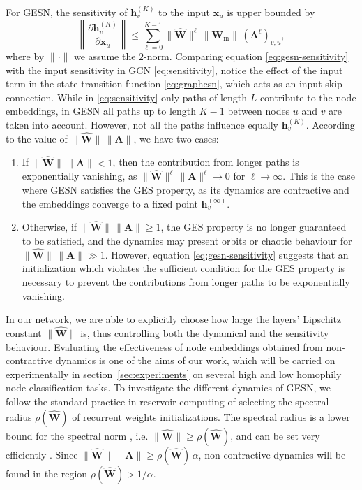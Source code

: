 \documentclass[final,5p,times,twocolumn]{elsarticle}
\begin{document}
For GESN, the sensitivity of $\mathbf{h}_v^{(K)}$ to the input $\mathbf{x}_{u}$ is upper bounded by
\begin{equation}\label{eq:gesn-sensitivity}
	\left\lVert \frac{\partial \mathbf{h}_v^{(K)}}{\partial \mathbf{x}_{u}} \right\rVert \leq \sum_{\ell=0}^{K-1} \lVert \mathbf{\hat{W}} \rVert^{\ell}\, \lVert \mathbf{W}_{\mathrm{in}} \rVert\, (\mathbf{A}^{\ell})_{v,u},
\end{equation}
where by $\lVert \cdot \rVert$ we assume the $2$-norm.
Comparing equation \eqref{eq:gesn-sensitivity} with the input sensitivity in GCN \eqref{eq:sensitivity}, notice the effect of the input term in the state transition function \eqref{eq:graphesn}, which acts as an input skip connection.
While in \eqref{eq:sensitivity} only paths of length $L$ contribute to the node embeddings, in GESN all paths up to length $K-1$ between nodes $u$ and $v$ are taken into account.
However, not all the paths influence equally $\mathbf{h}_v^{(K)}$.
According to the value of $\lVert \mathbf{\hat{W}} \rVert \, \lVert \mathbf{A} \rVert$, we have two cases:
\begin{enumerate}
	\item If $\lVert \mathbf{\hat{W}} \rVert \, \lVert \mathbf{A} \rVert < 1$, then the contribution from longer paths is exponentially vanishing, as $\lVert \mathbf{\hat{W}} \rVert^\ell \, \lVert \mathbf{A} \rVert^\ell \to 0$ for $\ell \to \infty$. This is the case where GESN satisfies the GES property, as its dynamics are contractive and the embeddings converge to a fixed point $\mathbf{h}_v^{(\infty)}$.
	\item Otherwise, if $\lVert \mathbf{\hat{W}} \rVert \, \lVert \mathbf{A} \rVert \geq 1$, the GES property is no longer guaranteed to be satisfied, and the dynamics may present orbits or chaotic behaviour for $\lVert \mathbf{\hat{W}} \rVert \, \lVert \mathbf{A} \rVert \gg 1$. However, equation \eqref{eq:gesn-sensitivity} suggests that an initialization which violates the sufficient condition for the GES property is necessary to prevent the contributions from longer paths to be exponentially vanishing.
\end{enumerate}
In our network, we are able to explicitly choose how large the layers' Lipschitz constant $\lVert \mathbf{\hat{W}} \rVert$ is, thus controlling both the dynamical and the sensitivity behaviour.
Evaluating the effectiveness of node embeddings obtained from non-contractive dynamics is one of the aims of our work, which will be carried on experimentally in section~\ref{sec:experiments} on several high and low homophily node classification tasks.
To investigate the different dynamics of GESN, we follow the standard practice in reservoir computing of selecting the spectral radius $\rho(\mathbf{\hat{W}})$ of recurrent weights initializations.
The spectral radius is a lower bound for the spectral norm \cite{Goldberg1974}, i.e. $\lVert \mathbf{\hat{W}} \rVert \geq \rho(\mathbf{\hat{W}})$, and can be set very efficiently \cite{Gallicchio2020inns}.
Since $\lVert \mathbf{\hat{W}} \rVert \, \lVert \mathbf{A} \rVert \geq \rho(\mathbf{\hat{W}})\, \alpha$, non-contractive dynamics will be found in the region $\rho(\mathbf{\hat{W}}) > 1 / \alpha$.
\end{document}
